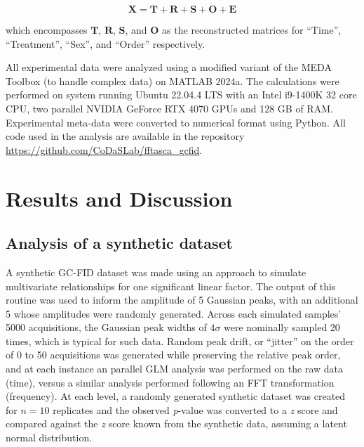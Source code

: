 \documentclass[preprint,12pt]{elsarticle}
\begin{document}
\begin{equation}\label{eq:GLM}
    \mathbf{X} = \mathbf{T} + \mathbf{R} + \mathbf{S} + \mathbf{O} + \mathbf{E}
\end{equation}

\noindent which encompasses $\mathbf{T}$, $\mathbf{R}$, $\mathbf{S}$, and $\mathbf{O}$ as the reconstructed matrices for ``Time'', ``Treatment'', ``Sex'', and ``Order'' respectively. 

All experimental data were analyzed using a modified variant of the MEDA Toolbox (to handle complex data) on MATLAB 2024a. The calculations were performed on system running Ubuntu 22.04.4 LTS with an Intel i9-1400K 32 core CPU, two parallel NVIDIA GeForce RTX 4070 GPUs and 128 GB of RAM. Experimental meta-data were converted to numerical format using Python. All code used in the analysis are available in the repository \url{https://github.com/CoDaSLab/fftasca_gcfid}.

\section{Results and Discussion}

\subsection{Analysis of a synthetic dataset}

A synthetic GC-FID dataset was made using an approach to simulate multivariate relationships \cite{Camacho2016} for one significant linear factor. The output of this routine was used to inform the amplitude of 5 Gaussian peaks, with an additional 5 whose amplitudes were randomly generated. Across each simulated samples' 5000 acquisitions, the Gaussian peak widths of $4\sigma$ were nominally sampled 20 times, which is typical for such data. Random peak drift, or ``jitter'' on the order of 0 to 50 acquisitions was generated while preserving the relative peak order, and at each instance an parallel GLM analysis was performed on the raw data (time), versus a similar analysis performed following an FFT transformation (frequency). At each level, a randomly generated synthetic dataset was created for $n=10$ replicates and the observed \textit{p}-value was converted to a \textit{z} score and compared against the \textit{z} score known from the synthetic data, assuming a latent normal distribution.
\end{document}
